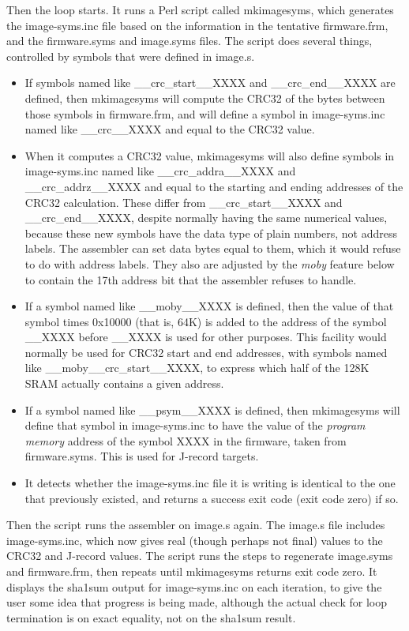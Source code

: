 Then the loop starts.  It runs a Perl script called mkimagesyms, which
generates the image-syms.inc file based on the information in the tentative
firmware.frm, and the firmware.syms and image.syms files.  The script does
several things, controlled by symbols that were defined in image.s.

\begin{itemize}
  \item If symbols named like \_\_crc\_start\_\_XXXX and \_\_crc\_end\_\_XXXX
    are defined, then mkimagesyms will compute the CRC32 of the bytes between those
    symbols in firmware.frm, and will define a symbol in image-syms.inc named
    like \_\_crc\_\_XXXX and equal to the CRC32 value.
  \item When it computes a CRC32 value, mkimagesyms will also define
    symbols in image-syms.inc named like \_\_crc\_addra\_\_XXXX and
    \_\_crc\_addrz\_\_XXXX and equal to the starting and ending addresses of
    the CRC32 calculation.  These differ from 
    \_\_crc\_start\_\_XXXX and \_\_crc\_end\_\_XXXX, despite normally having
    the same numerical values, because these new symbols have the
    data type of plain numbers, not address labels.  The assembler can set
    data bytes equal to them, which it would refuse
    to do with address labels.  They also are adjusted by the
    \emph{moby} feature below to contain the 17th address bit that the
    assembler refuses to handle.
  \item If a symbol named like \_\_moby\_\_XXXX is defined, then the value
    of that symbol times 0x10000 (that is, 64K) is added to the address of
    the symbol \_\_XXXX before \_\_XXXX is used for other purposes. 
    This facility would normally be used for CRC32 start
    and end addresses, with symbols named like
    \_\_moby\_\_crc\_start\_\_XXXX, to express which half of the 128K SRAM
    actually contains a given address.
  \item If a symbol named like \_\_psym\_\_XXXX is defined, then mkimagesyms
    will define that symbol in image-syms.inc to have the value of the
    \emph{program memory} address of the symbol XXXX in the firmware, taken
    from firmware.syms.  This is used for J-record targets.
  \item It detects whether the image-syms.inc file it is writing is
    identical to the one that previously existed, and returns a success exit
    code (exit code zero) if so.
\end{itemize}

Then the script runs the assembler on image.s again.  The image.s file
includes image-syms.inc, which now gives real (though perhaps not final)
values to the CRC32 and J-record values.  The script runs the steps to
regenerate image.syms and firmware.frm, then repeats until mkimagesyms
returns exit code zero.  It displays the sha1sum output for
image-syms.inc on each iteration, to give the user some idea that progress
is being made, although the actual check for loop termination is on exact
equality, not on the sha1sum result.

